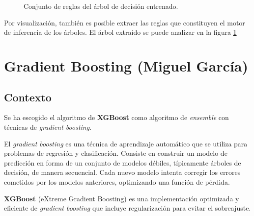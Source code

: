 \documentclass[12pt,letterpaper]{article}
\begin{document}
\begin{figure}[htp]
    \centering
    \caption{Conjunto de reglas del árbol de decisión entrenado.}
    \label{fig:decision_tree}
\end{figure}

Por visualización, también es posible extraer las reglas que constituyen el motor de inferencia de los árboles. El árbol extraído se puede analizar en la figura \ref{fig:decision_tree}

\section{Gradient Boosting (Miguel García)}
\subsection{Contexto}
Se ha escogido el algoritmo de \textbf{XGBoost} como algoritmo de \textit{ensemble} con técnicas de \textit{gradient boosting}. 

El \textit{gradient boosting} es una técnica de aprendizaje automático que se utiliza para problemas de regresión y clasificación. Consiste en construir un modelo de predicción en forma de un conjunto de modelos débiles, típicamente árboles de decisión, de manera secuencial. Cada nuevo modelo intenta corregir los errores cometidos por los modelos anteriores, optimizando una función de pérdida.

\textbf{XGBoost} (eXtreme Gradient Boosting) es una implementación optimizada y eficiente de \textit{gradient boosting} que incluye regularización para evitar el sobreajuste.
\end{document}
